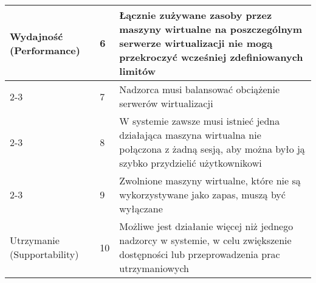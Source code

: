 \documentclass[../wstep.tex]{subfiles}
\begin{document}
\begin{table}[H]
\begin{tabular}{|p{}|p{}|p{}|}
        \multirow[t]{10}{=}{Wydajność (Performance)}    & 6            & Łącznie zużywane zasoby przez maszyny wirtualne na poszczególnym serwerze wirtualizacji nie mogą przekroczyć wcześniej zdefiniowanych limitów                                                                                                                                                                         \\ \cline{2-3}
                                                        & 7            & Nadzorca musi balansować obciążenie serwerów wirtualizacji                                                                                                                                                                                                                                                            \\ \cline{2-3}
                                                        & 8            & W systemie zawsze musi istnieć jedna działająca maszyna wirtualna nie połączona z żadną sesją, aby można było ją szybko przydzielić użytkownikowi                                                                                                                                                                     \\ \cline{2-3}
                                                        & 9            & Zwolnione maszyny wirtualne, które nie są wykorzystywane jako zapas, muszą być wyłączane                                                                                                                                                                                                                              \\ \hline
        \multirow[t]{3}{=}{Utrzymanie (Supportability)} & 10           & Możliwe jest działanie więcej niż jednego nadzorcy w systemie, w celu zwiększenie dostępności lub przeprowadzenia prac utrzymaniowych                                                                                                                                                                                 \\
        \hline
    \end{tabular}
\end{table}
\end{document}
